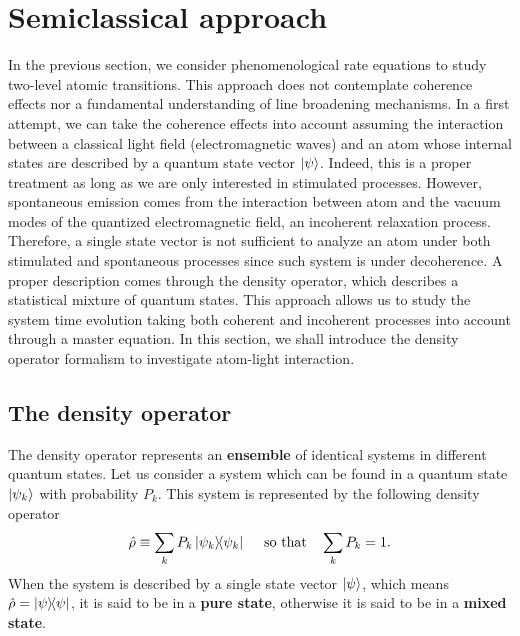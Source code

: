 %
\section{Semiclassical approach}
\label{sec:semiclassical-approach}
%

In the previous section, we consider phenomenological rate equations to study two-level atomic transitions. This approach does not contemplate coherence effects nor a fundamental understanding of line broadening mechanisms. In a first attempt, we can take the coherence effects into account assuming the interaction between a classical light field (electromagnetic waves) and an atom whose internal states are described by a quantum state vector $ \ket{\psi} $. Indeed, this is a proper treatment as long as we are only interested in stimulated processes. However, spontaneous emission comes from the interaction between atom and the vacuum modes of the quantized electromagnetic field, an incoherent relaxation process. Therefore, a single state vector is not sufficient to analyze an atom under both stimulated and spontaneous processes since such system is under decoherence. A proper description comes through the density operator, which describes a statistical mixture of quantum states. This approach allows us to study the system time evolution taking both coherent and incoherent processes into account through a master equation. In this section, we shall introduce the density operator formalism to investigate atom-light interaction.

%
\subsection{The density operator}
\label{sec:density-operator}
%

The density operator represents an \textbf{ensemble} of identical systems in different quantum states. Let us consider a system which can be found in a quantum state $ \ket{\psi_k} $ with probability $ P_{k} $. This system is represented by the following density operator
\begin{equation}
	\hat{\rho} \equiv \sum_{k} P_{k} \ketbra{\psi_k}{\psi_k}\ \ \ \ \textrm{so that}\ \ \ \sum_k P_k = 1.
\end{equation}
When the system is described by a single state vector $ \ket{\psi} $, which means $ \hat{\rho} = \ketbra{\psi}{\psi} $, it is said to be in a \textbf{pure state}, otherwise it is said to be in a \textbf{mixed state}.

